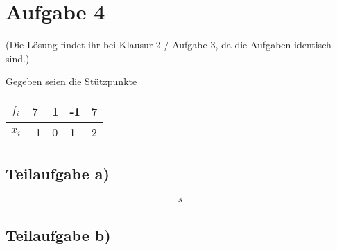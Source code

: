 \section*{Aufgabe 4}

(Die Lösung findet ihr bei Klausur 2 / Aufgabe 3, da die Aufgaben identisch sind.)


Gegeben seien die Stützpunkte

\begin{table}[H]
    \begin{tabular}{l|l|l|l|l}
    $f_i$ & 7  & 1 & -1 & 7 \\ \hline
    $x_i$ & -1 & 0 & 1  & 2 \\
    \end{tabular}
\end{table}

\subsection*{Teilaufgabe a)}
\begin{align*}
    s
\end{align*}

\subsection*{Teilaufgabe b)}
